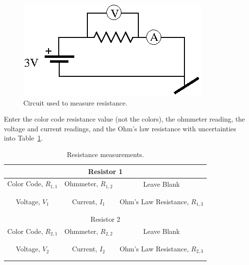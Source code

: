 \begin{figure}[htb]
\centering \epsfxsize=6cm \includegraphics[scale=1.5]{2_dc/procresist.eps}
\caption{Circuit used to measure resistance.}
\label{fig:DC:procresist}
\end{figure} 

\noindent Enter the color code resistance value (not the colors), the ohmmeter reading,
the voltage and current readings, and the Ohm's law resistance  with 
uncertainties into Table~\ref{tab:DC:resistmeas}.
\begin{table}[h]
\begin{center}
\begin{tabular}{|c|c|c|}
\hline
\multicolumn{3}{|c|}{Resistor 1} \\
\hline 
Color Code, $R_{1,1}$ & Ohmmeter, $R_{1,2}$ & Leave Blank\\ 
\hline
\hspace*{3cm} & \hspace*{3cm} & \hspace*{3cm} \\ 
& &  \\ 
\hline
Voltage, $V_1$ & Current, $I_1$ & Ohm's Law Resistance, $R_{1,3}$ \\
\hline
& &  \\
& &  \\
\hline
\hline
\multicolumn{3}{|c|}{Resistor 2} \\
\hline 
Color Code, $R_{2,1}$ & Ohmmeter, $R_{2,2}$ & Leave Blank\\ 
\hline
\hspace*{3cm} & \hspace*{3cm} & \hspace*{3cm} \\ 
& &  \\ 
\hline
Voltage, $V_2$ & Current, $I_2$ & Ohm's Law Resistance, $R_{2,3}$ \\
\hline
& &  \\
& &  \\
\hline
\end{tabular}
\end{center}
\caption{Resistance measurements.}
\label{tab:DC:resistmeas}
\end{table}


